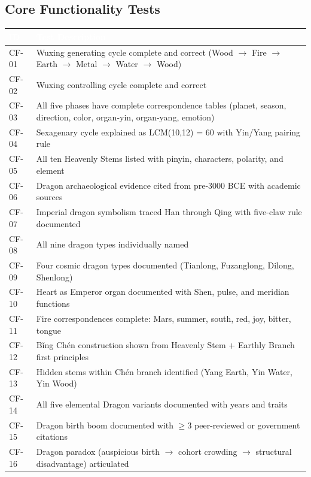 \documentclass[11pt,letterpaper]{article}
\newcommand{\tableheader}[1]{\textbf{\sffamily\textcolor{white}{#1}}}
\begin{document}
\subsection{Core Functionality Tests}

\begin{center}
\begin{tabularx}{\textwidth}{C{1.2cm}X}
\toprule
{}
\tableheader{ID} & \tableheader{Test Description} \\
\midrule
CF-01 & Wuxing generating cycle complete and correct (Wood $\rightarrow$ Fire $\rightarrow$ Earth $\rightarrow$ Metal $\rightarrow$ Water $\rightarrow$ Wood) \\
CF-02 & Wuxing controlling cycle complete and correct \\
CF-03 & All five phases have complete correspondence tables (planet, season, direction, color, organ-yin, organ-yang, emotion) \\
CF-04 & Sexagenary cycle explained as LCM(10,12) = 60 with Yin/Yang pairing rule \\
CF-05 & All ten Heavenly Stems listed with pinyin, characters, polarity, and element \\
CF-06 & Dragon archaeological evidence cited from pre-3000 BCE with academic sources \\
CF-07 & Imperial dragon symbolism traced Han through Qing with five-claw rule documented \\
CF-08 & All nine dragon types individually named \\
CF-09 & Four cosmic dragon types documented (Tianlong, Fuzanglong, Dilong, Shenlong) \\
CF-10 & Heart as Emperor organ documented with Shen, pulse, and meridian functions \\
CF-11 & Fire correspondences complete: Mars, summer, south, red, joy, bitter, tongue \\
CF-12 & Bǐng Chén construction shown from Heavenly Stem + Earthly Branch first principles \\
CF-13 & Hidden stems within Chén branch identified (Yang Earth, Yin Water, Yin Wood) \\
CF-14 & All five elemental Dragon variants documented with years and traits \\
CF-15 & Dragon birth boom documented with $\geq$3 peer-reviewed or government citations \\
CF-16 & Dragon paradox (auspicious birth $\rightarrow$ cohort crowding $\rightarrow$ structural disadvantage) articulated \\
\bottomrule
\end{tabularx}
\end{center}
\end{document}
